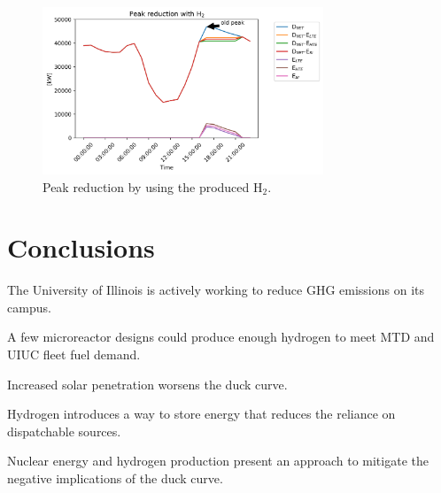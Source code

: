 \documentclass[11pt,letterpaper]{article}
\begin{document}
\begin{figure}[htbp!]
    \centering
	\includegraphics[height=5cm]{figures/uiuc-hydro3}
	\hfill
	\caption{Peak reduction by using the produced H$_2$.}
	\label{fig:uiuc-duck3}
\end{figure}

\section{Conclusions}

The University of Illinois is actively working to reduce GHG emissions on its campus.

A few microreactor designs could produce enough hydrogen to meet MTD and UIUC fleet fuel demand.

Increased solar penetration worsens the duck curve.

Hydrogen introduces a way to store energy that reduces the reliance on dispatchable sources.


Nuclear energy and hydrogen production present an approach to mitigate the negative implications of the duck curve.



\pagebreak


\end{document}
